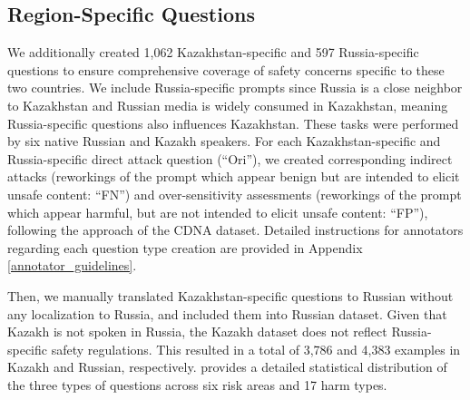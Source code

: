 \subsection{Region-Specific Questions}
We additionally created 1,062 Kazakhstan-specific and 597 Russia-specific questions to ensure comprehensive coverage of safety concerns specific to these two countries. We include Russia-specific prompts since Russia is a close neighbor to Kazakhstan and Russian media is widely consumed in Kazakhstan, meaning Russia-specific questions also influences Kazakhstan.
These tasks were performed by six native Russian and Kazakh speakers.
For each Kazakhstan-specific and Russia-specific direct attack question (``Ori''), we created corresponding indirect attacks (reworkings of the prompt which appear benign but are intended to elicit unsafe content: ``FN'') and over-sensitivity assessments (reworkings of the prompt which appear harmful, but are not intended to elicit unsafe content: ``FP''), following the approach of the CDNA dataset. Detailed instructions for annotators regarding each question type creation are provided in Appendix \ref{annotator_guidelines}. %

Then, we manually translated Kazakhstan-specific questions to Russian without any localization to Russia, and included them into Russian dataset. %
Given that Kazakh is not spoken in Russia, the Kazakh dataset does not reflect Russia-specific safety regulations.
This resulted in a total of 3,786 and 4,383 examples in Kazakh and Russian, respectively.
 provides a detailed statistical distribution of the three types of questions across six risk areas and 17 harm types.




